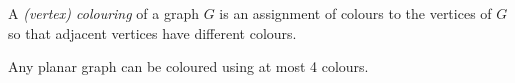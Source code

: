 \begin{definition}[Colouring] \label{def:planar_graphs:colouring}
    A \emph{(vertex) colouring} of a graph $G$ is an assignment of colours
    to the vertices of $G$ so that adjacent vertices have different colours.
\end{definition}

\begin{fact*} \label{thm:planar_graphs:4colour}
    Any planar graph can be coloured using at most 4 colours.
\end{fact*}
